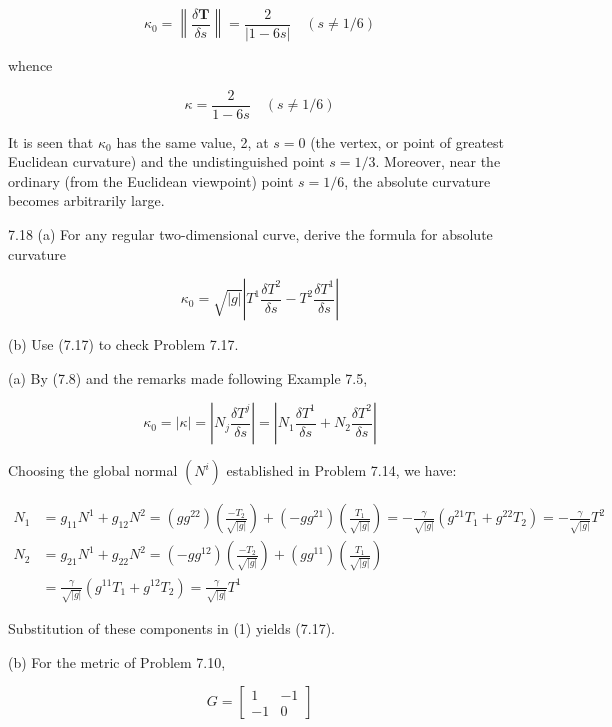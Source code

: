 \documentclass[10pt]{article}
\begin{document}
$$
\kappa_{0}=\left\|\frac{\delta \mathbf{T}}{\delta s}\right\|=\frac{2}{|1-6 s|} \quad(s \neq 1 / 6)
$$

whence

$$
\kappa=\frac{2}{1-6 s} \quad(s \neq 1 / 6)
$$

It is seen that $\kappa_{0}$ has the same value, 2, at $s=0$ (the vertex, or point of greatest Euclidean curvature) and the undistinguished point $s=1 / 3$. Moreover, near the ordinary (from the Euclidean viewpoint) point $s=1 / 6$, the absolute curvature becomes arbitrarily large.

7.18 (a) For any regular two-dimensional curve, derive the formula for absolute curvature


\begin{equation*}
\kappa_{0}=\sqrt{|g|}\left|T^{1} \frac{\delta T^{2}}{\delta s}-T^{2} \frac{\delta T^{1}}{\delta s}\right| \tag{7.17}
\end{equation*}


(b) Use (7.17) to check Problem 7.17.

(a) By (7.8) and the remarks made following Example 7.5,


\begin{equation*}
\kappa_{0}=|\kappa|=\left|N_{j} \frac{\delta T^{j}}{\delta s}\right|=\left|N_{1} \frac{\delta T^{1}}{\delta s}+N_{2} \frac{\delta T^{2}}{\delta s}\right| \tag{1}
\end{equation*}


Choosing the global normal $\left(N^{i}\right)$ established in Problem 7.14, we have:

$$
\begin{aligned}
N_{1} & =g_{11} N^{1}+g_{12} N^{2}=\left(g g^{22}\right)\left(\frac{-T_{2}}{\sqrt{|g|}}\right)+\left(-g g^{21}\right)\left(\frac{T_{1}}{\sqrt{|g|}}\right)=-\frac{\gamma}{\sqrt{|g|}}\left(g^{21} T_{1}+g^{22} T_{2}\right)=-\frac{\gamma}{\sqrt{|g|}} T^{2} \\
N_{2} & =g_{21} N^{1}+g_{22} N^{2}=\left(-g g^{12}\right)\left(\frac{-T_{2}}{\sqrt{|g|}}\right)+\left(g g^{11}\right)\left(\frac{T_{1}}{\sqrt{|g|}}\right) \\
& =\frac{\gamma}{\sqrt{|g|}}\left(g^{11} T_{1}+g^{12} T_{2}\right)=\frac{\gamma}{\sqrt{|g|}} T^{1}
\end{aligned}
$$

Substitution of these components in (1) yields (7.17).

(b) For the metric of Problem 7.10,

$$
G=\left[\begin{array}{rr}
1 & -1 \\
-1 & 0
\end{array}\right]
$$
\end{document}
